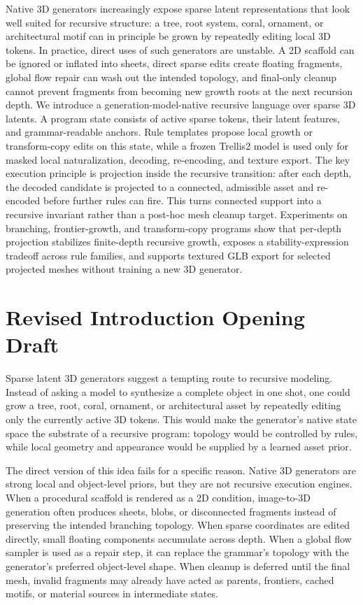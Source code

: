 Native 3D generators increasingly expose sparse latent representations that
look well suited for recursive structure: a tree, root system, coral, ornament,
or architectural motif can in principle be grown by repeatedly editing local
3D tokens. In practice, direct uses of such generators are unstable. A 2D
scaffold can be ignored or inflated into sheets, direct sparse edits create
floating fragments, global flow repair can wash out the intended topology, and
final-only cleanup cannot prevent fragments from becoming new growth roots at
the next recursion depth. We introduce a generation-model-native recursive
language over sparse 3D latents. A program state consists of active sparse
tokens, their latent features, and grammar-readable anchors. Rule templates
propose local growth or transform-copy edits on this state, while a frozen
Trellis2 model is used only for masked local naturalization, decoding,
re-encoding, and texture export. The key execution principle is projection
inside the recursive transition: after each depth, the decoded candidate is
projected to a connected, admissible asset and re-encoded before further rules
can fire. This turns connected support into a recursive invariant rather than a
post-hoc mesh cleanup target. Experiments on branching, frontier-growth, and
transform-copy programs show that per-depth projection stabilizes finite-depth
recursive growth, exposes a stability-expression tradeoff across rule families,
and supports textured GLB export for selected projected meshes without training
a new 3D generator.

\section*{Revised Introduction Opening Draft}

Sparse latent 3D generators suggest a tempting route to recursive modeling.
Instead of asking a model to synthesize a complete object in one shot, one could
grow a tree, root, coral, ornament, or architectural asset by repeatedly editing
only the currently active 3D tokens. This would make the generator's native
state space the substrate of a recursive program: topology would be controlled
by rules, while local geometry and appearance would be supplied by a learned
asset prior.

The direct version of this idea fails for a specific reason. Native 3D
generators are strong local and object-level priors, but they are not recursive
execution engines. When a procedural scaffold is rendered as a 2D condition,
image-to-3D generation often produces sheets, blobs, or disconnected fragments
instead of preserving the intended branching topology. When sparse coordinates
are edited directly, small floating components accumulate across depth. When a
global flow sampler is used as a repair step, it can replace the grammar's
topology with the generator's preferred object-level shape. When cleanup is
deferred until the final mesh, invalid fragments may already have acted as
parents, frontiers, cached motifs, or material sources in intermediate states.

